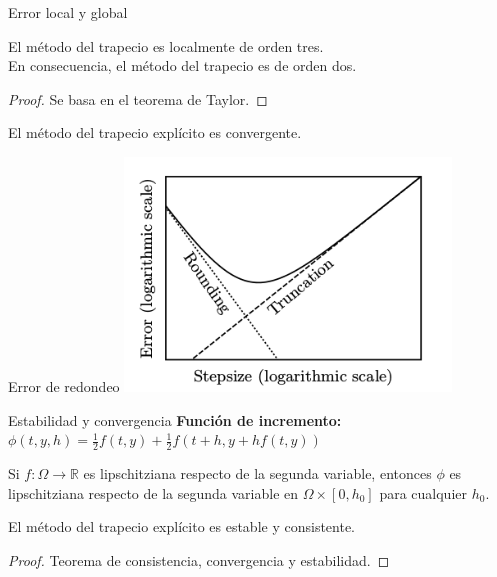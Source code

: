 		\begin{frame}{Error local y global}
			\begin{theorem}
				El método del trapecio es localmente de orden tres. \\
				En consecuencia, el método del trapecio es de orden dos.
			\end{theorem}
			
			\begin{proof}
				Se basa en el teorema de Taylor.
			\end{proof}

			\begin{corollary}
				El método del trapecio explícito es convergente.
			\end{corollary}
		\end{frame}
		
		\begin{frame}{Error de redondeo}
			\centering
			\includegraphics[width=0.65\textwidth]{./Images/redondeo.png}
		\end{frame}
		
		\begin{frame}{Estabilidad y convergencia}
			\textbf{Función de incremento:} $\phi(t,y,h)=\frac{1}{2}f(t,y)+\frac{1}{2}f(t+h,y+hf(t,y))$
			
			\begin{proposition}
				Si $f: \Omega \rightarrow \mathbb{R}$ es lipschitziana respecto de la segunda variable, entonces $\phi$ es lipschitziana respecto de la segunda variable en $\Omega \times [0, h_0]$ para cualquier $h_0$.
			\end{proposition}
			
			\begin{corollary}
				El método del trapecio explícito es estable y consistente.
			\end{corollary}
			\begin{proof}
				Teorema de consistencia, convergencia y estabilidad.
			\end{proof}
		\end{frame}